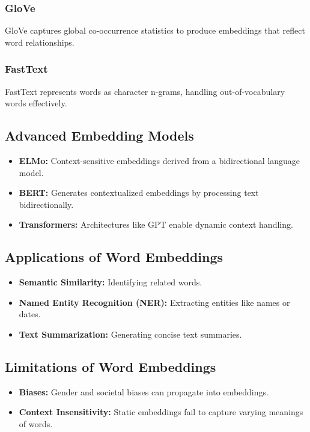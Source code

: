 \subsubsection{GloVe}
GloVe captures global co-occurrence statistics to produce embeddings that reflect word relationships.

\subsubsection{FastText}
FastText represents words as character n-grams, handling out-of-vocabulary words effectively.

\subsection{Advanced Embedding Models}
\begin{itemize}
    \item \textbf{ELMo:} Context-sensitive embeddings derived from a bidirectional language model.
    \item \textbf{BERT:} Generates contextualized embeddings by processing text bidirectionally.
    \item \textbf{Transformers:} Architectures like GPT enable dynamic context handling.
\end{itemize}

\subsection{Applications of Word Embeddings}
\begin{itemize}
    \item \textbf{Semantic Similarity:} Identifying related words.
    \item \textbf{Named Entity Recognition (NER):} Extracting entities like names or dates.
    \item \textbf{Text Summarization:} Generating concise text summaries.
\end{itemize}

\subsection{Limitations of Word Embeddings}
\begin{itemize}
    \item \textbf{Biases:} Gender and societal biases can propagate into embeddings.
    \item \textbf{Context Insensitivity:} Static embeddings fail to capture varying meanings of words.
\end{itemize}

